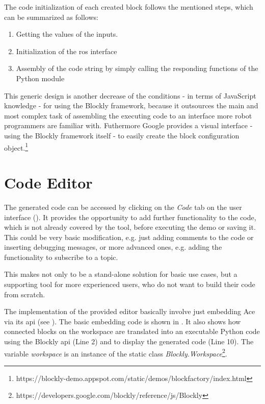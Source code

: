 The code initialization of each created block follows the mentioned steps, which can be summarized as follows:
\begin{enumerate}
	\item Getting the values of the inputs.
	\item Initialization of the \gls{ros} interface
	\item Assembly of the code string by simply calling the responding functions of the Python module
\end{enumerate}

This generic design is another decrease of the conditions - in terms of JavaScript knowledge - for using the Blockly framework, because it outsources the main and most complex task of assembling the executing code to an interface more robot programmers are familiar with. Futhermore Google provides a visual interface - using the Blockly framework itself - to easily create the block configuration object.\footnote{https://blockly-demo.appspot.com/static/demos/blockfactory/index.html}

\section{Code Editor} \label{sec:CodeEditor}
The generated code can be accessed by clicking on the \textit{Code} tab on the user interface (). It provides the opportunity to add further functionality to the code, which is not already covered by the tool, before executing the demo or saving it. This could be very basic modification, e.g. just adding comments to the code or inserting debugging messages, or more advanced ones, e.g. adding the functionality to subscribe to a topic.

This makes \toolname{} not only to be a stand-alone solution for basic use cases, but a supporting tool for more experienced users, who do not want to build their code from scratch.

\begin{figure}[htbp]
	
\end{figure}

The implementation of the provided editor basically involve just embedding Ace via its \gls{api} (see ). The basic embedding code is shown in . It also shows how connected blocks on the workspace are translated into an executable Python code using the Blockly \gls{api} (Line 2) and to display the generated code (Line 10). The variable \textit{workspace} is an instance of the static class \textit{Blockly.Workspace}\footnote{https://developers.google.com/blockly/reference/js/Blockly}.

